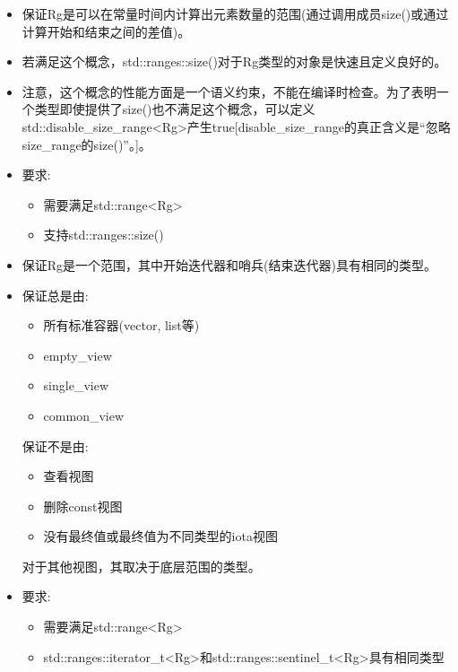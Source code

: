 \begin{itemize}
\item
保证Rg是可以在常量时间内计算出元素数量的范围(通过调用成员size()或通过计算开始和结束之间的差值)。

\item
若满足这个概念，std::ranges::size()对于Rg类型的对象是快速且定义良好的。

\item
注意，这个概念的性能方面是一个语义约束，不能在编译时检查。为了表明一个类型即使提供了size()也不满足这个概念，可以定义std::disable\_size\_range<Rg>产生true[disable\_size\_range的真正含义是“忽略size\_range的size()”。]。

\item
要求:

\begin{itemize}
\item
需要满足std::range<Rg>

\item
支持std::ranges::size()
\end{itemize}
\end{itemize}


\begin{itemize}
\item
保证Rg是一个范围，其中开始迭代器和哨兵(结束迭代器)具有相同的类型。

\item
保证总是由:

\begin{itemize}
\item
所有标准容器(vector, list等)

\item
empty\_view

\item
single\_view

\item
common\_view
\end{itemize}

保证不是由:

\begin{itemize}
\item
查看视图

\item
删除const视图

\item
没有最终值或最终值为不同类型的iota视图
\end{itemize}

对于其他视图，其取决于底层范围的类型。

\item
要求:

\begin{itemize}
\item
需要满足std::range<Rg>

\item
std::ranges::iterator\_t<Rg>和std::ranges::sentinel\_t<Rg>具有相同类型
\end{itemize}
\end{itemize}

